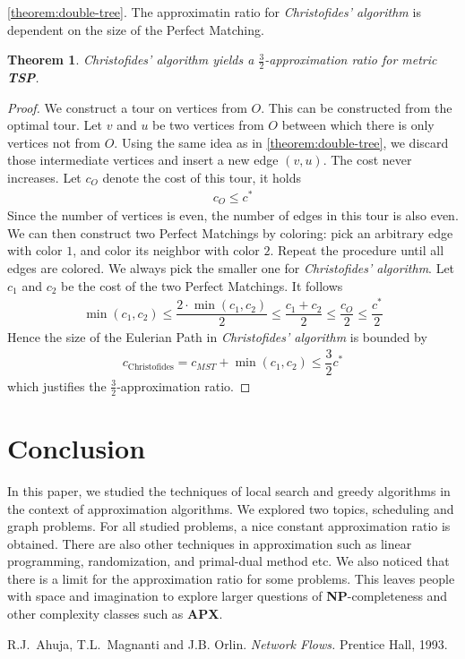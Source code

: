 \documentclass[11pt,psfig,times]{article}
\newcommand*{\NP}{\textbf{NP}}
\newtheorem{theorem}{Theorem}
\begin{document}
\cref{theorem:double-tree}. The approximatin ratio for \textit{Christofides' algorithm} is dependent on the size 
of the Perfect Matching.
\begin{theorem}
    Christofides' algorithm yields a $\frac{3}{2}$-approximation ratio for metric \textbf{TSP}.
\end{theorem}
\begin{proof}
    We construct a tour on vertices from $O$. This can be constructed from the optimal tour. 
    Let $v$ and $u$ be two vertices from $O$ between which there is only vertices not from $O$. 
    Using the same idea as in \cref{theorem:double-tree}, we discard those intermediate vertices and 
    insert a new edge $(v, u)$. The cost never increases. Let $c_O$ denote the cost of this tour, 
    it holds 
    \begin{align*}
        c_O \leq c^*
    \end{align*}
    Since the number of vertices is even, the number of edges in this tour is also even. We can then 
    construct two Perfect Matchings by coloring: pick an arbitrary edge with color $1$, and 
    color its neighbor with color $2$. Repeat the procedure until all edges are colored. 
    We always pick the smaller one for \textit{Christofides' algorithm}.
    Let $c_1$ and $c_2$ be the cost of the two Perfect Matchings. It follows 
    \begin{align*}
        \min(c_1, c_2) \leq \dfrac{2 \cdot \min(c_1, c_2)}{2} \leq \dfrac{c_1 + c_2}{2} \leq \dfrac{c_O}{2} \leq \dfrac{c^*}{2}
    \end{align*}
    Hence the size of the Eulerian Path in \textit{Christofides' algorithm} is bounded by 
    \begin{align*}
        c_{\text{Christofides}} = c_{MST} + \min(c_1, c_2) \leq \dfrac{3}{2} c^*
    \end{align*}
    which justifies the $\frac{3}{2}$-approximation ratio.
\end{proof}

\section{Conclusion}
In this paper, we studied the techniques of local search and greedy algorithms in 
the context of approximation algorithms. We explored two topics, scheduling and graph problems. 
For all studied problems, a nice constant approximation ratio is obtained. There are also 
other techniques in approximation such as linear programming, randomization, and primal-dual method etc.
We also noticed that there is a limit for the approximation ratio for some problems. 
This leaves people with space and imagination to explore larger questions of \NP-completeness and other complexity classes such as \textbf{APX}. 

\begin{thebibliography}{10}
\setlength{\itemsep}{0pt plus .3pt}
\setlength{\parsep}{0pt plus .3pt}
\setlength{\parskip}{0pt plus .3pt}

R.J.\ Ahuja, T.L.\ Magnanti and J.B. Orlin. {\em Network Flows.\/} Prentice Hall, 1993.

\end{thebibliography}
\end{document}
